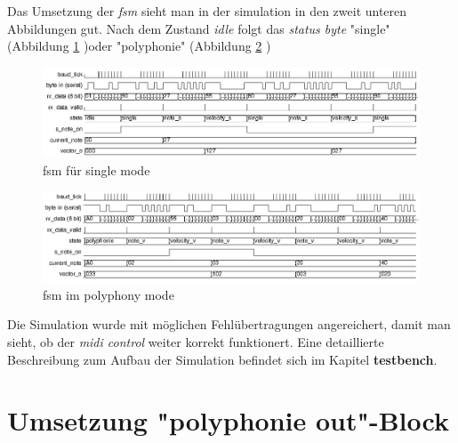 Das Umsetzung der \textit{fsm} sieht man in der simulation in den zweit unteren Abbildungen gut. Nach dem Zustand \textit{idle} folgt das \textit{status byte} "single" (Abbildung \ref{fig.midicontrol_singlet} )oder "polyphonie" (Abbildung \ref{fig.midicontrol_polyphonie} )\\  

\begin{figure}[H]
	\centering
	\includegraphics[width=1\textwidth]{images/midi_control/wave_single.png}
	\caption{fsm für single mode}
	\label{fig.midicontrol_singlet}
\end{figure}

\begin{figure}[H]
	\centering
	\includegraphics[width=1\textwidth]{images/midi_control/wave_polyphonie.png}
	\caption{fsm im polyphony mode}
	\label{fig.midicontrol_polyphonie}
\end{figure}

Die Simulation wurde mit möglichen Fehlübertragungen angereichert, damit man sieht, ob der \textit{midi control} weiter korrekt funktionert. Eine detaillierte Beschreibung zum Aufbau der Simulation befindet sich im Kapitel \textbf{testbench}.\\


\section{Umsetzung "polyphonie out"-Block}\label{sect.polyphonie_umsetzung}